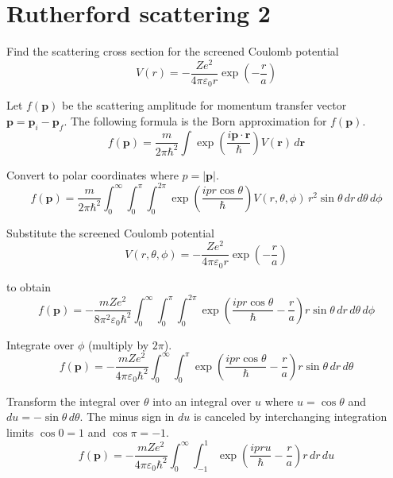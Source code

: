 

\section*{Rutherford scattering 2}

Find the scattering cross section for the screened Coulomb potential
\begin{equation*}
V(r)=-\frac{Ze^2}{4\pi\varepsilon_0r}\exp\left(-\frac{r}{a}\right)
\end{equation*}

Let $f(\mathbf p)$ be the scattering amplitude for momentum transfer vector
$\mathbf p=\mathbf p_i-\mathbf p_f$.
The following formula is the Born approximation for $f(\mathbf p)$.
\begin{equation*}
f(\mathbf p)
=\frac{m}{2\pi\hbar^2}
\int\exp\left(\frac{i\mathbf p\cdot\mathbf r}{\hbar}\right)V(\mathbf r)\,d\mathbf r
\end{equation*}

Convert to polar coordinates where $p=|\mathbf p|$.
\begin{equation*}
f(\mathbf p)
=\frac{m}{2\pi\hbar^2}
\int_0^\infty
\int_0^\pi
\int_0^{2\pi}
\exp\left(\frac{ipr\cos\theta}{\hbar}\right)V(r,\theta,\phi)
\,r^2\sin\theta\,dr\,d\theta\,d\phi
\end{equation*}

Substitute the screened Coulomb potential
\begin{equation*}
V(r,\theta,\phi)=-\frac{Ze^2}{4\pi\varepsilon_0r}\exp\left(-\frac{r}{a}\right)
\end{equation*}

to obtain
\begin{equation*}
f(\mathbf p)
=-\frac{mZe^2}{8\pi^2\varepsilon_0\hbar^2}
\int_0^\infty
\int_0^\pi
\int_0^{2\pi}
\exp\left(\frac{ipr\cos\theta}{\hbar}-\frac{r}{a}\right)
r\sin\theta\,dr\,d\theta\,d\phi
\end{equation*}

Integrate over $\phi$ (multiply by $2\pi$).
\begin{equation*}
f(\mathbf p)
=-\frac{mZe^2}{4\pi\varepsilon_0\hbar^2}
\int_0^\infty
\int_0^\pi
\exp\left(\frac{ipr\cos\theta}{\hbar}-\frac{r}{a}\right)
r\sin\theta\,dr\,d\theta
\end{equation*}

Transform the integral over $\theta$ into an integral over $u$
where $u=\cos\theta$ and $du=-\sin\theta\,d\theta$.
The minus sign in $du$ is canceled by interchanging integration limits
$\cos0=1$ and $\cos\pi=-1$.
\begin{equation*}
f(\mathbf p)
=-\frac{mZe^2}{4\pi\varepsilon_0\hbar^2}
\int_0^\infty
\int_{-1}^1
\exp\left(\frac{ipru}{\hbar}-\frac{r}{a}\right)
r\,dr\,du
\end{equation*}

